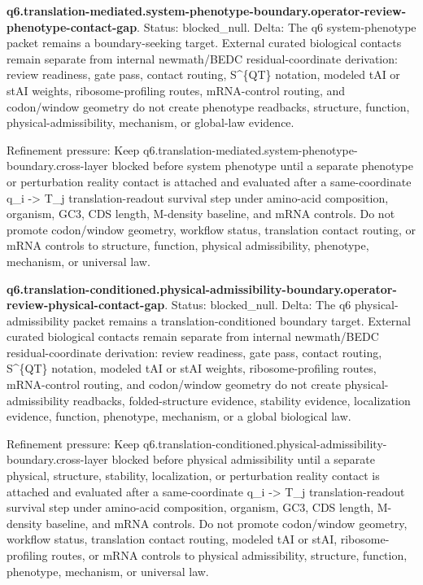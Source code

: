 \textbf{q6.translation-mediated.system-phenotype-boundary.operator-review-phenotype-contact-gap}. Status: blocked\_null. Delta: The q6 system-phenotype packet remains a boundary-seeking target. External curated biological contacts remain separate from internal newmath/BEDC residual-coordinate derivation: review readiness, gate pass, contact routing, S\textasciicircum{}\{QT\} notation, modeled tAI or stAI weights, ribosome-profiling routes, mRNA-control routing, and codon/window geometry do not create phenotype readbacks, structure, function, physical-admissibility, mechanism, or global-law evidence.

Refinement pressure: Keep q6.translation-mediated.system-phenotype-boundary.cross-layer blocked before system phenotype until a separate phenotype or perturbation reality contact is attached and evaluated after a same-coordinate q\_i -> T\_j translation-readout survival step under amino-acid composition, organism, GC3, CDS length, M-density baseline, and mRNA controls. Do not promote codon/window geometry, workflow status, translation contact routing, or mRNA controls to structure, function, physical admissibility, phenotype, mechanism, or universal law.

\textbf{q6.translation-conditioned.physical-admissibility-boundary.operator-review-physical-contact-gap}. Status: blocked\_null. Delta: The q6 physical-admissibility packet remains a translation-conditioned boundary target. External curated biological contacts remain separate from internal newmath/BEDC residual-coordinate derivation: review readiness, gate pass, contact routing, S\textasciicircum{}\{QT\} notation, modeled tAI or stAI weights, ribosome-profiling routes, mRNA-control routing, and codon/window geometry do not create physical-admissibility readbacks, folded-structure evidence, stability evidence, localization evidence, function, phenotype, mechanism, or a global biological law.

Refinement pressure: Keep q6.translation-conditioned.physical-admissibility-boundary.cross-layer blocked before physical admissibility until a separate physical, structure, stability, localization, or perturbation reality contact is attached and evaluated after a same-coordinate q\_i -> T\_j translation-readout survival step under amino-acid composition, organism, GC3, CDS length, M-density baseline, and mRNA controls. Do not promote codon/window geometry, workflow status, translation contact routing, modeled tAI or stAI, ribosome-profiling routes, or mRNA controls to physical admissibility, structure, function, phenotype, mechanism, or universal law.

